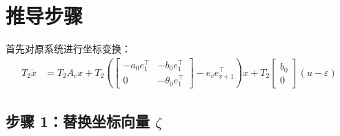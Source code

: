 \documentclass[12pt,a4paper]{article}
\begin{document}
\section{推导步骤}

首先对原系统进行坐标变换：
\begin{align*}
T_2\dot{x} &= T_2 A_c x +
T_2 \left(
\left[
\begin{array}{c|c}
-a_0e_1^\top & -b_0e_1^\top \\ \hline
0 & -\theta_0e_1^\top
\end{array}
\right]
- e_v e_{v+1}^\top
\right) x +
T_2 \begin{bmatrix} b_0 \\ 0 \end{bmatrix} (u-\varepsilon)
\end{align*}

\subsection{步骤 1：替换坐标向量 $\zeta$}
\end{document}

